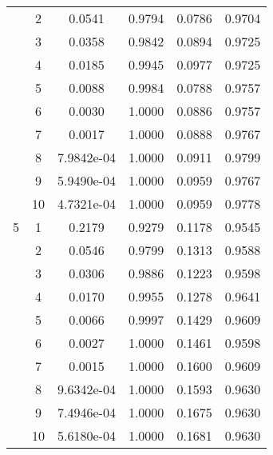\begin{center}
\begin{longtable}{|c|c|c|c|c|c|}
& 2 & 0.0541 & 0.9794 & 0.0786 & 0.9704 \\
& 3 & 0.0358 & 0.9842 & 0.0894 & 0.9725 \\
& 4 & 0.0185 & 0.9945 & 0.0977 & 0.9725 \\
& 5 & 0.0088 & 0.9984 & 0.0788 & 0.9757 \\
& 6 & 0.0030 & 1.0000 & 0.0886 & 0.9757 \\
& 7 & 0.0017 & 1.0000 & 0.0888 & 0.9767 \\
& 8 & 7.9842e-04 & 1.0000 & 0.0911 & 0.9799 \\
& 9 & 5.9490e-04 & 1.0000 & 0.0959 & 0.9767 \\
& 10 & 4.7321e-04 & 1.0000 & 0.0959 & 0.9778 \\
\hline
5 & 1 & 0.2179 & 0.9279 & 0.1178 & 0.9545 \\
& 2 & 0.0546 & 0.9799 & 0.1313 & 0.9588 \\
& 3 & 0.0306 & 0.9886 & 0.1223 & 0.9598 \\
& 4 & 0.0170 & 0.9955 & 0.1278 & 0.9641 \\
& 5 & 0.0066 & 0.9997 & 0.1429 & 0.9609 \\
& 6 & 0.0027 & 1.0000 & 0.1461 & 0.9598 \\
& 7 & 0.0015 & 1.0000 & 0.1600 & 0.9609 \\
& 8 & 9.6342e-04 & 1.0000 & 0.1593 & 0.9630 \\
& 9 & 7.4946e-04 & 1.0000 & 0.1675 & 0.9630 \\
& 10 & 5.6180e-04 & 1.0000 & 0.1681 & 0.9630 \\
\hline
\end{longtable}
\label{table:resnet50}
\end{center}




